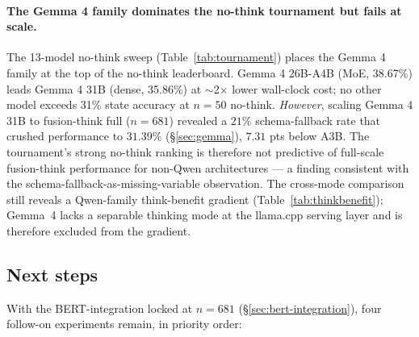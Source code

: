 \documentclass[11pt]{article}
\begin{document}
\paragraph{The Gemma 4 family dominates the no-think tournament but fails at scale.} The 13-model no-think sweep (Table~\ref{tab:tournament}) places the Gemma 4 family at the top of the no-think leaderboard. Gemma 4 26B-A4B (MoE, 38.67\%) leads Gemma 4 31B (dense, 35.86\%) at $\sim$2$\times$ lower wall-clock cost; no other model exceeds 31\% state accuracy at $n{=}50$ no-think. \emph{However}, scaling Gemma 4 31B to fusion-think full ($n{=}681$) revealed a $21\%$ schema-fallback rate that crushed performance to $31.39\%$ (\S\ref{sec:gemma}), $7.31$ pts below A3B. The tournament's strong no-think ranking is therefore not predictive of full-scale fusion-think performance for non-Qwen architectures --- a finding consistent with the schema-fallback-as-missing-variable observation. The cross-mode comparison still reveals a Qwen-family think-benefit gradient (Table~\ref{tab:thinkbenefit}); Gemma~4 lacks a separable thinking mode at the llama.cpp serving layer and is therefore excluded from the gradient.

\subsection{Next steps}
\label{sec:nextsteps}

With the BERT-integration locked at $n{=}681$ (\S\ref{sec:bert-integration}), four follow-on experiments remain, in priority order:
\end{document}
